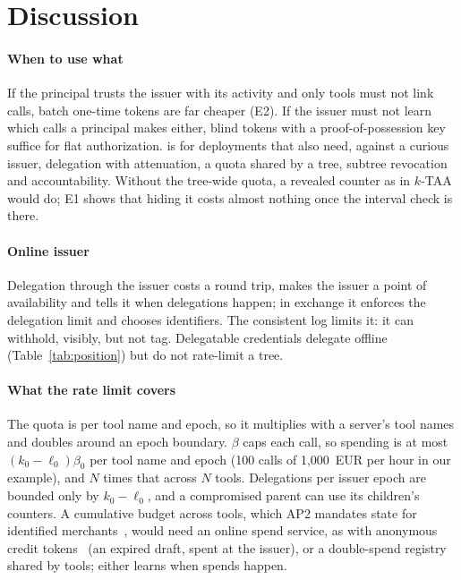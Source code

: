 \section{Discussion}\label{sec:discussion}
\paragraph*{When to use what} If the principal trusts the issuer with its activity and only tools must not link calls, batch one-time tokens are far cheaper (E2). If the issuer must not learn which calls a principal makes either, blind tokens with a proof-of-possession key suffice for flat authorization. \sys{} is for deployments that also need, against a curious issuer, delegation with attenuation, a quota shared by a tree, subtree revocation and accountability. Without the tree-wide quota, a revealed counter as in $k$-TAA would do; E1 shows that hiding it costs almost nothing once the interval check is there.

\paragraph*{Online issuer} Delegation through the issuer costs a round trip, makes the issuer a point of availability and tells it when delegations happen; in exchange it enforces the delegation limit and chooses identifiers. The consistent log limits it: it can withhold, visibly, but not tag. Delegatable credentials delegate offline (Table~\ref{tab:position}) but do not rate-limit a tree.

\paragraph*{What the rate limit covers} The quota is per tool name and epoch, so it multiplies with a server's tool names and doubles around an epoch boundary. $\beta$ caps each call, so spending is at most $(k_0-\ell_0)\beta_0$ per tool name and epoch (100 calls of 1{,}000~EUR per hour in our example), and $N$ times that across $N$ tools. Delegations per issuer epoch are bounded only by $k_0-\ell_0$, and a compromised parent can use its children's counters. A cumulative budget across tools, which AP2 mandates state for identified merchants~\cite{ap2-2025}, would need an online spend service, as with anonymous credit tokens~\cite{schlesinger2026act} (an expired draft, spent at the issuer), or a double-spend registry shared by tools; either learns when spends happen.

